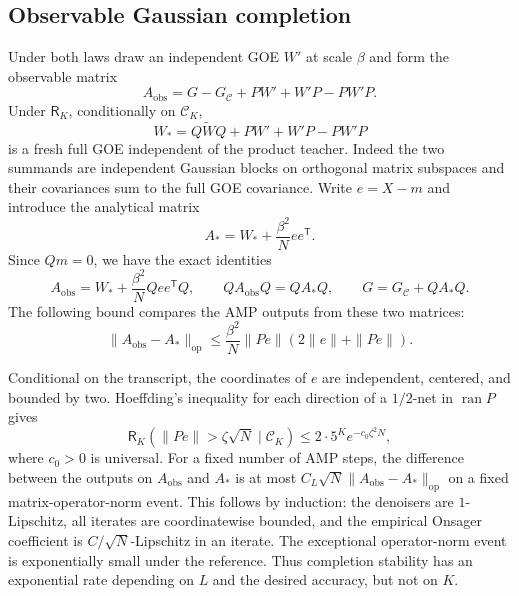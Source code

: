 \documentclass[11pt,reqno]{amsart}
\begin{document}
\subsection{Observable Gaussian completion}
\label{curv:completion}

Under both laws draw an independent GOE $W'$ at scale $\beta$ and form
the observable matrix
\begin{equation*}
             A_{\mathrm{obs}}
             =G-G_{\mathcal C}+PW'+W'P-PW'P.
\end{equation*}
Under $\mathsf R_K$, conditionally on $\mathcal C_K$,
\[
 W_*=Q\widetilde WQ+PW'+W'P-PW'P
\]
is a fresh full GOE independent of the product teacher. Indeed the two
summands are independent Gaussian blocks on orthogonal matrix subspaces
and their covariances sum to the full GOE covariance. Write $e=X-m$ and
introduce the analytical matrix
\begin{equation*}
                       A_*=W_*+\frac{\beta^2}{N}ee^{\mathsf T}.
\end{equation*}
Since $Qm=0$, we have the exact identities
\begin{equation}\label{curv:completion-exact}
 A_{\mathrm{obs}}=W_*+\frac{\beta^2}{N}Qee^{\mathsf T}Q,
 \qquad QA_{\mathrm{obs}}Q=QA_*Q,
 \qquad G=G_{\mathcal C}+QA_*Q.
\end{equation}
The following bound compares the AMP outputs from these two matrices:
\begin{equation}\label{curv:completion-error}
 \|A_{\mathrm{obs}}-A_*\|_{\mathrm{op}}
 \le\frac{\beta^2}{N}\|Pe\|(2\|e\|+\|Pe\|).
\end{equation}

Conditional on the transcript, the coordinates of $e$ are independent,
centered, and bounded by two. Hoeffding's inequality
\cite{boucheron2013concentration} for each direction
of a $1/2$-net in $\operatorname{ran}P$ gives
\begin{equation}\label{curv:product-projection}
 \mathsf R_K(\|Pe\|>\zeta\sqrt N\mid\mathcal C_K)
                  \le 2\cdot5^K e^{-c_0\zeta^2N},
\end{equation}
where $c_0>0$ is universal. For a fixed number of AMP steps, the difference
between the outputs on $A_{\mathrm{obs}}$ and $A_*$ is at most
$C_L\sqrt N\|A_{\mathrm{obs}}-A_*\|_{\mathrm{op}}$ on a fixed
matrix-operator-norm event. This follows by induction: the denoisers are
$1$-Lipschitz, all iterates are coordinatewise bounded, and the empirical
Onsager coefficient is $C/\sqrt N$-Lipschitz in an iterate. The exceptional
operator-norm event is exponentially small under the reference. Thus
completion stability has an exponential rate depending on $L$ and the
desired accuracy, but not on $K$.
\end{document}
